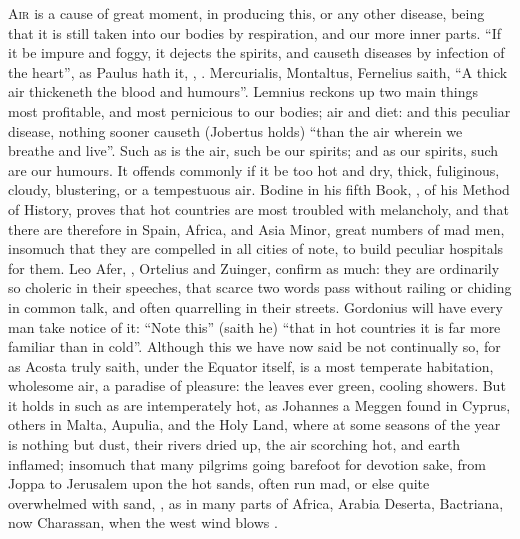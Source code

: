 \lettrine{A}{ir} is a cause of great moment, in producing this, or any other
disease, being that it is still taken into our bodies by respiration, and our
more inner parts. \enquote{If it be impure and foggy, it dejects
the spirits, and causeth diseases by infection of the heart}, as Paulus hath
it,  \Avicenna{}, . Mercurialis, Montaltus, \etc{}
Fernelius saith, \enquote{A thick air thickeneth the blood and
humours}. Lemnius reckons up two main things most
profitable, and most pernicious to our bodies; air and diet: and this peculiar
disease, nothing sooner causeth (Jobertus holds) \enquote{than the
air wherein we breathe and live}. Such as is the air, such
be our spirits; and as our spirits, such are our humours. It offends commonly
if it be too hot and dry, thick, fuliginous, cloudy,
blustering, or a tempestuous air. Bodine in his fifth Book,
, of his Method of History, proves
that hot countries are most troubled with melancholy, and that there are
therefore in Spain, Africa, and Asia Minor, great numbers of mad men, insomuch
that they are compelled in all cities of note, to build peculiar hospitals for
them. Leo Afer, , Ortelius and Zuinger, confirm as much: they are ordinarily so choleric
in their speeches, that scarce two words pass without railing or chiding in
common talk, and often quarrelling in their streets.
Gordonius will have every man take notice of it: \enquote{Note
this} (saith he) \enquote{that in hot countries it is far more familiar than in cold}.
Although this we have now said be not continually so, for as
Acosta truly saith, under the Equator itself, is a most
temperate habitation, wholesome air, a paradise of pleasure: the leaves ever
green, cooling showers. But it holds in such as are intemperately hot, as
Johannes a Meggen found in Cyprus, others in Malta,
Aupulia, and the Holy Land, where at some seasons of the
year is nothing but dust, their rivers dried up, the air scorching hot, and
earth inflamed; insomuch that many pilgrims going barefoot for devotion sake,
from Joppa to Jerusalem upon the hot sands, often run mad, or else quite
overwhelmed with sand, , as in many parts of Africa,
Arabia Deserta, Bactriana, now Charassan, when the west wind blows .

